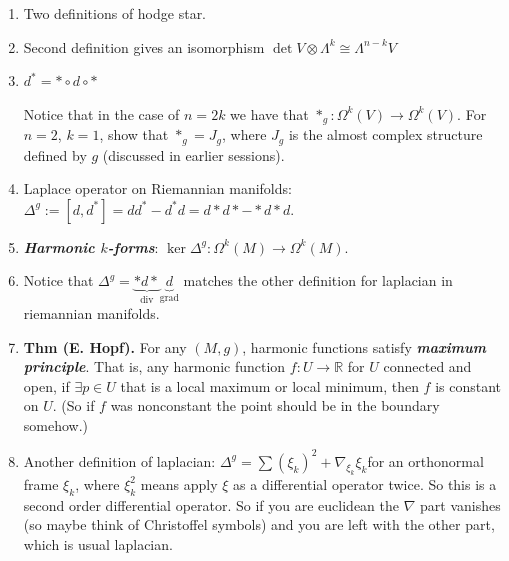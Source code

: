 \begin{enumerate}
\item Two definitions of hodge star.
\item Second definition gives an isomorphism \(\det V\otimes \Lambda^{k}\cong \Lambda^{n-k}V\) 
\item \(d^*=* \circ d \circ *\)
\begin{exercise}\leavevmode
Notice that in the case of \(n=2k\) we have that \(*_g:\Omega^{k}(V)\to \Omega^{k}(V)\). For \(n=2\), \(k=1\), show that \(*_g=J_g\), where \(J_g\) is the almost complex structure defined by \(g\) (discussed in earlier sessions).
\end{exercise}
\item Laplace operator on Riemannian manifolds: \(\Delta^g:=[d,d^*]=d d^*-d^* d=d * d *- * d * d.\)
\item \textit{\textbf{Harmonic \(k\)-forms}}: \(\ker \Delta^g:\Omega^{k}(M)\to \Omega^{k}(M)\).
\item Notice that \(\Delta^g=\underbrace{* d *}_{\operatorname{div}}\underbrace{d}_{\operatorname{grad}}\) matches the other definition for laplacian in riemannian manifolds.
	\item \textbf{Thm (E. Hopf).} For any \((M,g)\), harmonic functions satisfy \textit{\textbf{maximum principle}}. That is, any harmonic function \(f:U \to \mathbb{R}\) for \(U\) connected and open, if \(\exists p \in U\) that is a local maximum or local minimum, then \(f\) is constant on \(U\). (So if \(f\) was nonconstant the point should be in the boundary somehow.)
	\item Another definition of laplacian: \(\Delta^g=\sum(\xi_k)^2+\nabla_{\xi_k}\xi_k\)for an orthonormal frame \(\xi_k\), where \(\xi_k^2\) means apply \(\xi\) as a differential operator twice. So this is a second order differential operator. So if you are euclidean the \(\nabla\) part vanishes (so maybe think of Christoffel symbols) and you are left with the other part, which is usual laplacian.


\end{enumerate}
